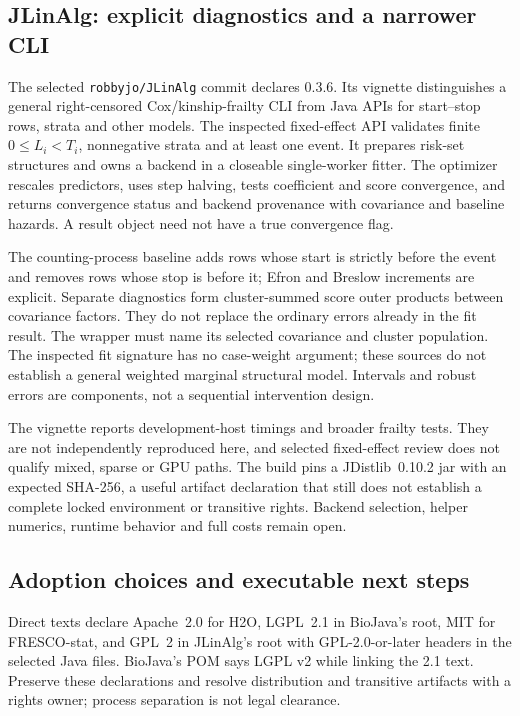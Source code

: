 \subsection{JLinAlg: explicit diagnostics and a narrower CLI}
The selected \texttt{robbyjo/JLinAlg} commit declares 0.3.6. Its vignette
distinguishes a general right-censored Cox/kinship-frailty CLI from Java APIs
for start--stop rows, strata and other models. The inspected fixed-effect API
validates finite $0\leq L_i<T_i$, nonnegative strata and at least one event.
It prepares risk-set structures and owns a backend in a closeable single-worker
fitter. The optimizer rescales predictors, uses step halving, tests coefficient
and score convergence, and returns convergence status and backend provenance
with covariance and baseline hazards. A result object need not have a true
convergence flag. \citep{exec24_longjava_jlinalg}

The counting-process baseline adds rows whose start is strictly before the
event and removes rows whose stop is before it; Efron and Breslow increments
are explicit. Separate diagnostics form cluster-summed score outer products
between covariance factors. They do not replace the ordinary errors already
in the fit result. The wrapper must name its selected covariance and cluster
population. The inspected fit signature has no case-weight argument; these
sources do not establish a general weighted marginal structural model.
Intervals and robust errors are components, not a sequential intervention
design. \citep{exec24_longjava_jlinalg}

The vignette reports development-host timings and broader frailty tests.
They are not independently reproduced here, and selected fixed-effect review
does not qualify mixed, sparse or GPU paths. The build pins a JDistlib~0.10.2
jar with an expected SHA-256, a useful artifact declaration that still does
not establish a complete locked environment or transitive rights. Backend
selection, helper numerics, runtime behavior and full costs remain open.
\citep{exec24_longjava_jlinalg}

\subsection{Adoption choices and executable next steps}
Direct texts declare Apache~2.0 for H2O, LGPL~2.1 in BioJava's root,
MIT for FRESCO-stat, and GPL~2 in JLinAlg's root with GPL-2.0-or-later
headers in the selected Java files. BioJava's POM says LGPL v2 while linking
the 2.1 text. Preserve these declarations and resolve distribution and
transitive artifacts with a rights owner; process separation is not legal
clearance. \citep{exec24_longjava_h2o,exec24_longjava_biojava,exec24_longjava_fresco,exec24_longjava_jlinalg}

